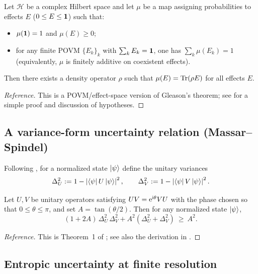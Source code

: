 \begin{theorem}
\label{thm:busch_gleason_povm}
Let $\mathcal{H}$ be a complex Hilbert space and let $\mu$ be a map assigning probabilities to effects $E$ ($0\le E\le \mathbf{1}$) such that:
\begin{itemize}
\item $\mu(\mathbf{1})=1$ and $\mu(E)\ge 0$;
\item for any finite POVM $\{E_k\}_k$ with $\sum_k E_k=\mathbf{1}$, one has $\sum_k \mu(E_k)=1$ (equivalently, $\mu$ is finitely additive on coexistent effects).
\end{itemize}
Then there exists a density operator $\rho$ such that $\mu(E)=\mathrm{Tr}(\rho E)$ for all effects $E$.
\end{theorem}

\begin{proof}[Reference]
This is a POVM/effect-space version of Gleason's theorem; see \cite{Busch2003} for a simple proof and discussion of hypotheses.
\end{proof}

\subsection{A variance-form uncertainty relation (Massar--Spindel)}
\label{sec:massar_spindel}

Following \cite{MassarSpindel2008}, for a normalized state $\ket{\psi}$ define the unitary variances
\[
\Delta_U^2:=1-\left\lvert \bra{\psi}U\ket{\psi}\right\rvert^2,
\qquad
\Delta_V^2:=1-\left\lvert \bra{\psi}V\ket{\psi}\right\rvert^2.
\]

\begin{theorem}
\label{thm:weyl_uncertainty}
Let $U,V$ be unitary operators satisfying $UV=\mathrm{e}^{\mathrm{i}\theta}VU$ with the phase chosen so that $0\le \theta\le \pi$, and set $A=\tan(\theta/2)$.
Then for any normalized state $\ket{\psi}$,
\begin{equation}
\label{eq:weyl_variance_uncertainty}
(1+2A)\,\Delta_U^2\,\Delta_V^2 + A^2(\Delta_U^2+\Delta_V^2)\ \ge\ A^2.
\end{equation}
\end{theorem}

\begin{proof}[Reference]
This is Theorem~1 of \cite{MassarSpindel2008}; see also the derivation in \cite[Appendix]{Ma2025CT}.
\end{proof}

\subsection{Entropic uncertainty at finite resolution}
\label{sec:entropic_uncertainty}

